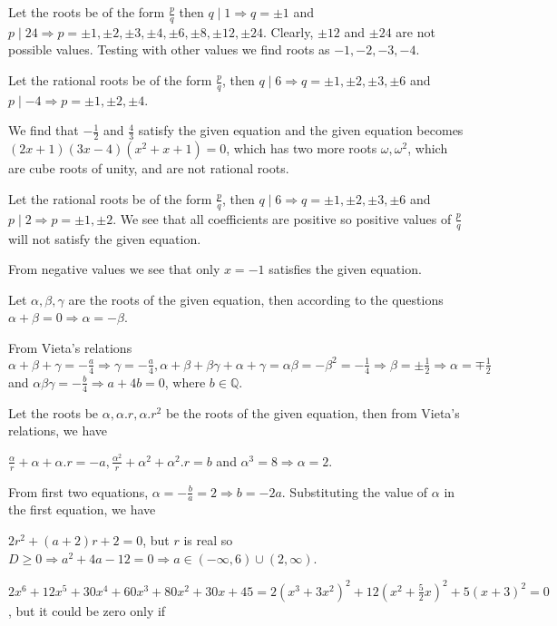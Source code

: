   Let the roots be of the form $\frac{p}{q}$ then $q\mid 1 \Rightarrow q = \pm 1$ and $p\mid 24 \Rightarrow
  p = \pm1, \pm2, \pm3, \pm4, \pm6, \pm8, \pm12, \pm24$. Clearly, $\pm12$ and $\pm24$ are not possible
  values. Testing with other values we find roots as $-1, -2, -3, -4$.
\item Let the rational roots be of the form $\frac{p}{q}$, then $q\mid 6 \Rightarrow q = \pm1, \pm2, \pm3,
  \pm6$ and $p\mid -4 \Rightarrow p = \pm 1, \pm2, \pm4$.

  We find that $-\frac{1}{2}$ and $\frac{4}{3}$ satisfy the given equation and the given equation becomes
  $(2x + 1)(3x - 4)(x^2 + x + 1) = 0$, which has two more roots $\omega, \omega^2$, which are cube roots of
  unity, and are not rational roots.
\item Let the rational roots be of the form $\frac{p}{q}$, then $q\mid 6 \Rightarrow q = \pm1, \pm2, \pm3,
  \pm6$ and $p\mid 2 \Rightarrow p = \pm1, \pm2$. We see that all coefficients are positive so positive
  values of $\frac{p}{q}$ will not satisfy the given equation.

  From negative values we see that only $x = -1$ satisfies the given equation.
\item Let $\alpha, \beta, \gamma$ are the roots of the given equation, then according to the questions
  $\alpha + \beta = 0 \Rightarrow \alpha = -\beta$.

  From Vieta's relations $\alpha + \beta + \gamma = -\frac{a}{4}\Rightarrow \gamma = -\frac{a}{4}, \alpha +
  \beta + \beta\gamma + \alpha + \gamma = \alpha\beta = -\beta^2 = -\frac{1}{4}\Rightarrow \beta =
  \pm\frac{1}{2} \Rightarrow \alpha = \mp\frac{1}{2}$ and $\alpha\beta\gamma = -\frac{b}{4}\Rightarrow a +
  4b = 0$, where $b\in\mathbb{Q}$.
\item Let the roots be $\alpha, \alpha.r, \alpha.r^2$ be the roots of the given equation, then from Vieta's
  relations, we have

  $\frac{\alpha}{r} + \alpha + \alpha.r = -a, \frac{\alpha^2}{r} + \alpha^2 + \alpha^2.r = b$ and $\alpha^3
  = 8 \Rightarrow \alpha = 2$.

  From first two equations, $\alpha = -\frac{b}{a} = 2 \Rightarrow b = -2a$. Substituting the value of
  $\alpha$ in the first equation, we have

  $2r^2 + (a + 2)r + 2 = 0$, but $r$ is real so $D\geq 0 \Rightarrow a^2 + 4a - 12 = 0 \Rightarrow
  a\in(-\infty, 6)\cup(2, \infty)$.
\item $2x^6 + 12x^5 + 30x^4 + 60x^3 + 80x^2 + 30x + 45 = 2(x^3 + 3x^2)^2 + 12\left(x^2 +
  \frac{5}{2}x\right)^2 + 5(x + 3)^2 = 0$, but it could be zero only if

